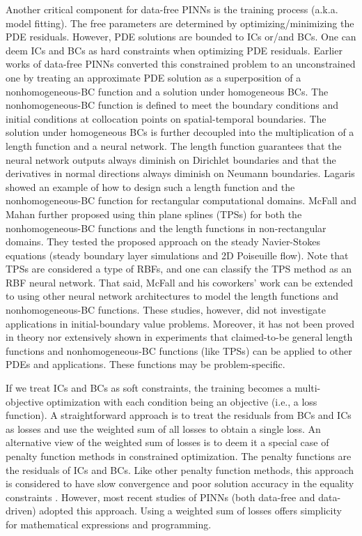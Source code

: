 Another critical component for data-free PINNs is the training process (a.k.a. model fitting).
The free parameters are determined by optimizing/minimizing the PDE residuals.
However, PDE solutions are bounded to ICs or/and BCs.
One can deem ICs and BCs as hard constraints when optimizing PDE residuals.
Earlier works of data-free PINNs converted this constrained problem to an unconstrained one by treating an approximate PDE solution as a superposition of a nonhomogeneous-BC function and a solution under homogeneous BCs.
The nonhomogeneous-BC function is defined to meet the boundary conditions and initial conditions at collocation points on spatial-temporal boundaries.
The solution under homogeneous BCs is further decoupled into the multiplication of a length function and a neural network. 
The length function guarantees that the neural network outputs always diminish on Dirichlet boundaries and that the derivatives in normal directions always diminish on Neumann boundaries.
Lagaris \cite{lagaris_artificial_1998} showed an example of how to design such a length function and the nonhomogeneous-BC function for rectangular computational domains.
McFall and Mahan \cite{McFall2009} further proposed using thin plane splines (TPSs) for both the nonhomogeneous-BC functions and the length functions in non-rectangular domains.
They tested the proposed approach on the steady Navier-Stokes equations (steady boundary layer simulations and 2D Poiseuille flow). 
Note that TPSs are considered a type of RBFs, and one can classify the TPS method as an RBF neural network.
That said, McFall and his coworkers' work can be extended to using other neural network architectures to model the length functions and nonhomogeneous-BC functions.
These studies, however, did not investigate applications in initial-boundary value problems.
Moreover, it has not been proved in theory nor extensively shown in experiments that claimed-to-be general length functions and nonhomogeneous-BC functions (like TPSs) can be applied to other PDEs and applications.
These functions may be problem-specific.

If we treat ICs and BCs as soft constraints, the training becomes a multi-objective optimization with each condition being an objective (i.e., a loss function).
A straightforward approach is to treat the residuals from BCs and ICs as losses and use the weighted sum of all losses to obtain a single loss. 
An alternative view of the weighted sum of losses is to deem it a special case of penalty function methods in constrained optimization.
The penalty functions are the residuals of ICs and BCs.
Like other penalty function methods, this approach is considered to have slow convergence and poor solution accuracy in the equality constraints \cite{rudd_constrained_2014}.
However, most recent studies of PINNs (both data-free and data-driven) adopted this approach.
Using a weighted sum of losses offers simplicity for mathematical expressions and programming.

